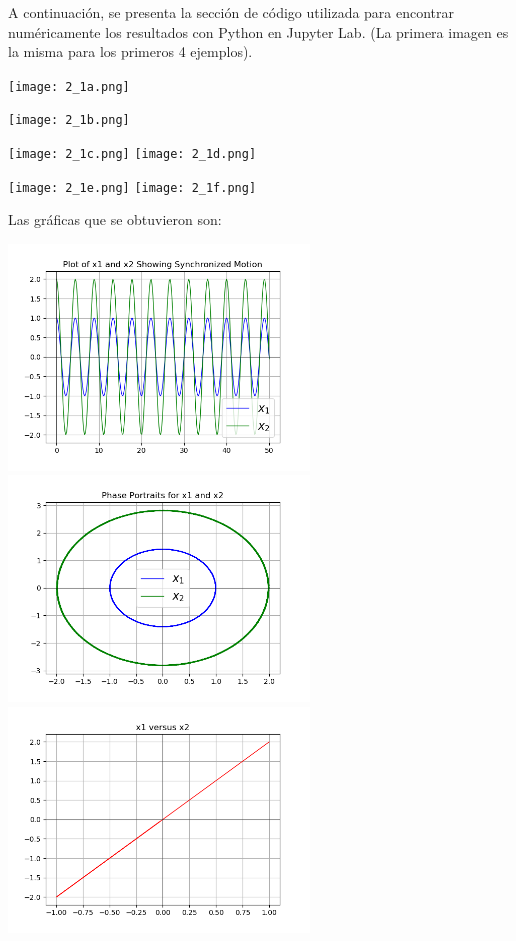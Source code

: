 \documentclass[12pt]{article}
\begin{document}
A continuación, se presenta la sección de código utilizada para encontrar numéricamente los resultados con Python en Jupyter Lab. (La primera imagen es la misma para los primeros 4 ejemplos).
\begin{center}
	\texttt{[image: 2\_1a.png]}
\end{center}
\begin{center}
    \texttt{[image: 2\_1b.png]}
\end{center}
\begin{center}
    \texttt{[image: 2\_1c.png]}\hspace*{\fill}
    \texttt{[image: 2\_1d.png]}
\end{center}
\begin{center}
    \texttt{[image: 2\_1e.png]}\hspace*{\fill}
    \texttt{[image: 2\_1f.png]}
\end{center}
Las gráficas que se obtuvieron son:
\begin{center}
    \includegraphics[height=6cm]{G2_1a.png}\hspace*{\fill}
    \includegraphics[height=6cm]{G2_1b.png}\\
    \includegraphics[height=6cm]{G2_1c.png}\
\end{center}
\end{document}
